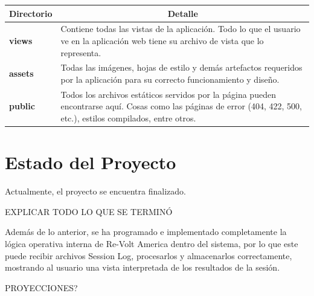 \begin{center}
  \begin{tabular}{ | l | p{12.5cm} |}
    \hline
    \multicolumn{1}{|c|}{\textbf{Directorio}} & \multicolumn{1}{|c|}{\textbf{Detalle}} \\
    \hline
    
    {\textbf{views}} & Contiene todas las vistas de la aplicación. Todo lo que el usuario ve en la aplicación web tiene su archivo de vista que lo representa. \\ \hline
    
    {\textbf{assets}} & Todas las imágenes, hojas de estilo y demás artefactos requeridos por la aplicación para su correcto funcionamiento y diseño. \\ \hline
    
    {\textbf{public}} & Todos los archivos estáticos servidos por la página pueden encontrarse aquí. Cosas como las páginas de error (404, 422, 500, etc.), estilos compilados, entre otros.\\ \hline
  \end{tabular}
\end{center}

\section{Estado del Proyecto}
Actualmente, el proyecto se encuentra finalizado.

EXPLICAR TODO LO QUE SE TERMINÓ

Además de lo anterior, se ha programado e implementado completamente la lógica operativa interna de Re-Volt America dentro del sistema, por lo que este puede recibir archivos Session Log, procesarlos y almacenarlos correctamente, mostrando al usuario una vista interpretada de los resultados de la sesión.

PROYECCIONES?




